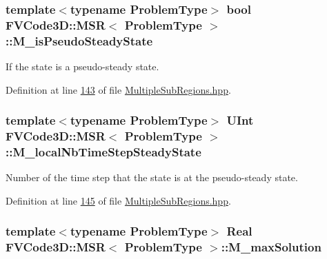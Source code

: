 \subsubsection[{\texorpdfstring{M\+\_\+is\+Pseudo\+Steady\+State}{M_isPseudoSteadyState}}]{\setlength{\rightskip}{0pt plus 5cm}template$<$typename Problem\+Type$>$ bool {\bf F\+V\+Code3\+D\+::\+M\+SR}$<$ Problem\+Type $>$\+::M\+\_\+is\+Pseudo\+Steady\+State\hspace{0.3cm}{\ttfamily [private]}}\hypertarget{classFVCode3D_1_1MSR_aa4276f60467226b5aae9e12c024701f6}{}\label{classFVCode3D_1_1MSR_aa4276f60467226b5aae9e12c024701f6}


If the state is a pseudo-\/steady state. 



Definition at line \hyperlink{MultipleSubRegions_8hpp_source_l00143}{143} of file \hyperlink{MultipleSubRegions_8hpp_source}{Multiple\+Sub\+Regions.\+hpp}.

\subsubsection[{\texorpdfstring{M\+\_\+local\+Nb\+Time\+Step\+Steady\+State}{M_localNbTimeStepSteadyState}}]{\setlength{\rightskip}{0pt plus 5cm}template$<$typename Problem\+Type$>$ {\bf U\+Int} {\bf F\+V\+Code3\+D\+::\+M\+SR}$<$ Problem\+Type $>$\+::M\+\_\+local\+Nb\+Time\+Step\+Steady\+State\hspace{0.3cm}{\ttfamily [private]}}\hypertarget{classFVCode3D_1_1MSR_a481d90b7ea3b6d1f3f818f811e58a9a3}{}\label{classFVCode3D_1_1MSR_a481d90b7ea3b6d1f3f818f811e58a9a3}


Number of the time step that the state is at the pseudo-\/steady state. 



Definition at line \hyperlink{MultipleSubRegions_8hpp_source_l00145}{145} of file \hyperlink{MultipleSubRegions_8hpp_source}{Multiple\+Sub\+Regions.\+hpp}.

\subsubsection[{\texorpdfstring{M\+\_\+max\+Solution}{M_maxSolution}}]{\setlength{\rightskip}{0pt plus 5cm}template$<$typename Problem\+Type$>$ {\bf Real} {\bf F\+V\+Code3\+D\+::\+M\+SR}$<$ Problem\+Type $>$\+::M\+\_\+max\+Solution\hspace{0.3cm}{\ttfamily [private]}}\hypertarget{classFVCode3D_1_1MSR_a292e038fb48f7f4f39238d375ea6f6e0}{}\label{classFVCode3D_1_1MSR_a292e038fb48f7f4f39238d375ea6f6e0}


